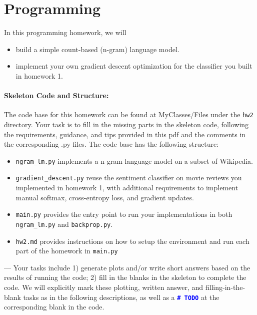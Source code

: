 \newpage
    



\section{Programming}
In this programming homework, we will
\begin{itemize}
    \item build a simple count-based (n-gram) language model.
    \item implement your own gradient descent optimization for the classifier you built in homework 1.
\end{itemize}


\noindent \paragraph{Skeleton Code and Structure:}
The code base for this homework can be found at MyClasses/Files under the \texttt{hw2} directory. Your task is to fill in the missing parts in the skeleton code, following the requirements, guidance, and tips provided in this pdf and the comments in the corresponding .py files.
The code base has the following structure:
\begin{itemize}
    \item \texttt{ngram\_lm.py} implements a n-gram language model on a subset of Wikipedia. 
    \item \texttt{gradient\_descent.py} reuse the sentiment classifier on movie reviews you implemented in homework 1, with additional requirements to implement manual softmax, cross-entropy loss, and gradient updates.
    \item \texttt{main.py} provides the entry point to run your implementations in both \texttt{ngram\_lm.py} and \texttt{backprop.py}.
    \item \texttt{hw2.md} provides instructions on how to setup the environment and run each part of the homework in \texttt{main.py}
\end{itemize}


\noindent \todo{} ---
Your tasks include
1) generate plots and/or write short answers based on the results of running the code; 2) fill in the blanks in the skeleton to complete the code. We will explicitly mark these plotting, written answer, and filling-in-the-blank tasks as \todo{} in the following descriptions, as well as a \textcolor{blue}{\texttt{\textbf{\#~TODO}}} at the corresponding blank in the code. \\

